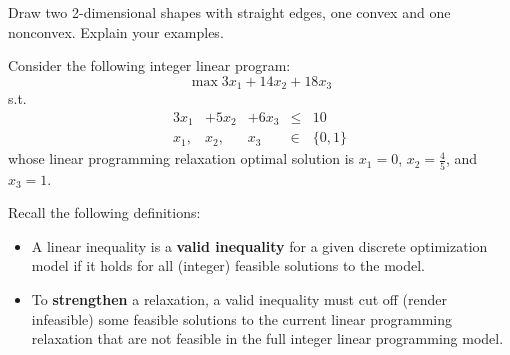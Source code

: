 \documentclass[12pt]{exam}
\begin{document}
\begin{questions}
\question  Draw two 2-dimensional shapes with straight edges, one convex and one nonconvex.  Explain your examples.
\begin{solution}
\end{solution}
\newpage
\question Consider the following integer linear program:
\[
\max  3 x_1 + 14 x_2 + 18 x_3
\]
s.t.
\begin{equation}
  \label{lp}
  \tag{$P$}
  \begin{array}{rrrcr}
  3 x_1 & + 5 x_2 & + 6 x_3 & \leq & 10 \\
  x_1, & x_2, & x_3 & \in & \{0,1\}
\end{array}
\end{equation}
whose linear programming relaxation optimal solution is $x_1 = 0$, $x_2 = \frac{4}{5}$, and $x_3 = 1$.

\vspace{0.2 cm}
\noindent Recall the following definitions:
\begin{itemize}
\item A linear inequality is a \textbf{valid inequality} for a given discrete optimization model if it holds for all (integer) feasible solutions to the model.
\item To \textbf{strengthen} a relaxation, a valid inequality must cut off (render infeasible) some feasible solutions to the current linear programming relaxation that are not feasible in the full integer linear programming model.
\end{itemize}

\bigskip
{}
\end{questions}
\end{document}
